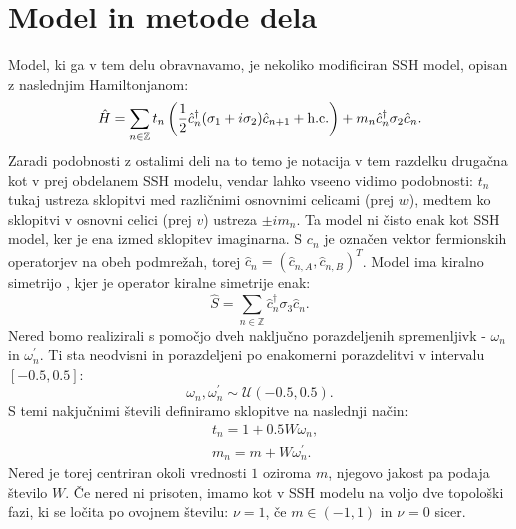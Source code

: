 \chapter{Model in metode dela}
Model, ki ga v tem delu obravnavamo, je nekoliko modificiran SSH model, opisan z naslednjim Hamiltonjanom:
\begin{equation}
\hat{H} = \sum_{n \in \mathbb{Z}} t_n \left( \frac{1}{2} \hat{c}_n^\dagger (\sigma_1 + i \sigma_2) \hat{c}_{n+1} + \textup{h.c.} \right) + m_n \hat{c}_n^\dagger \sigma_2 \hat{c}_n.
\end{equation}
Zaradi podobnosti z ostalimi deli na to temo \cite{mondragon} je notacija v tem razdelku drugačna kot v prej obdelanem SSH modelu, vendar lahko vseeno vidimo podobnosti: $t_n$ tukaj ustreza sklopitvi med različnimi osnovnimi celicami (prej $w$), medtem ko sklopitvi v osnovni celici (prej $v$) ustreza $\pm i m_n$. Ta model ni čisto enak kot SSH model, ker je ena izmed sklopitev imaginarna. S $c_n$ je označen vektor fermionskih operatorjev na obeh podmrežah, torej
$\hat{c}_n = (\hat{c}_{n,A} , \hat{c}_{n,B})^T$.
Model ima kiralno simetrijo \cite{mondragon}, kjer je operator kiralne simetrije enak:
\begin{equation}
\hat{S} = \sum_{n  \in \mathbb{Z}} \hat{c}_n^\dagger \sigma_3 \hat{c}_n.
\end{equation}
Nered bomo realizirali s pomočjo dveh naključno porazdeljenih spremenljivk - $\omega_n$ in $\omega_n^\prime$. Ti sta neodvisni in porazdeljeni po enakomerni porazdelitvi v intervalu $[ -0.5 , 0.5]$:
\begin{equation}
\omega_n, \omega_n^\prime \sim \mathcal{U}(-0.5,0.5).
\end{equation}
S temi nakjučnimi števili definiramo sklopitve na naslednji način:
\begin{align} \label{sklopitvi}
&t_n = 1 + 0.5 W \omega_n, \\
&m_n = m + W \omega_n^\prime.
\end{align}
Nered je torej centriran okoli vrednosti $1$ oziroma $m$, njegovo jakost pa podaja število $W$.
Če nered ni prisoten, imamo kot v SSH modelu na voljo dve topološki fazi, ki se ločita po ovojnem številu: $\nu=1$, če $m \in (-1,1)$ in $\nu=0$ sicer.

